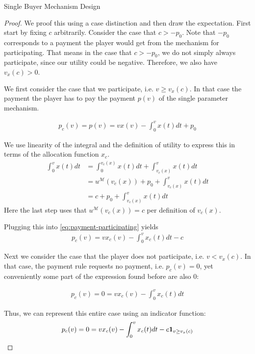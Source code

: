 \documentclass[11pt,a4paper]{article}
\newcommand{\1}[1]{\mbox{\rm\bf 1}_{#1}}
\begin{document}
\begin{section}{Single Buyer Mechanism Design}
 \begin{proof}
     We proof this using a case distinction and then draw the expectation.
     First start by fixing $c$ arbitrarily.
     Consider the case that $c > -p_0$. Note that $-p_0$ corresponds to a payment the player would get from the mechanism for participating.
     That means in the case that $c > -p_0$, we do not simply always participate, since our utility could be negative. Therefore, we also have $v_x(c) > 0$.

     We first consider the case that we participate, i.e. $v \geq v_x(c)$.
     In that case the payment the player has to pay the payment $p(v)$ of the single parameter mechanism.

     \begin{align}
         \label{eq:payment-participating}
         p_c(v) = p(v) = v x(v) - \int_0^v x(t) dt + p_0
     \end{align}

     We use linearity of the integral and the definition of utility to express this in terms of the allocation function $x_c$.
     \begin{align*}
         \int_0^v x(t) dt & = \int_0^{v_c(x)} x(t) dt + \int_{v_c(x)}^v x(t) dt     \\
                          & = u^\mathcal{M}(v_c(x)) + p_0 + \int_{v_c(x)}^v x(t) dt \\
                          & = c + p_0 + \int_{v_c(x)}^v x(t) dt
     \end{align*}
     Here the last step uses that $u^\mathcal{M}(v_c(x)) = c$ per definition of $v_c(x)$.

     Plugging this into \autoref{eq:payment-participating} yields
     \begin{align*}
         p_c(v) = v x_c(v) - \int_0^v x_c(t) dt - c
     \end{align*}

     Next we consider the case that the player does not participate, i.e. $v < v_x(c)$.
     In that case, the payment rule requests no payment, i.e. $p_c(v) = 0$, yet conveniently some part of the expression found before are also $0$:

     \begin{align*}
         p_c(v) = 0 = v x_c(v) - \int_0^v x_c(t) dt
     \end{align*}

     Thus, we can represent this entire case using an indicator function:
     \begin{align*}
         p_c(v) = 0 = v x_c(v) - \int_0^v x_c(t) dt - c \1{v \geq v_x(c)}
     \end{align*}


\end{proof}
\end{section}
\end{document}
